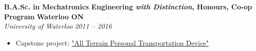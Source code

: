     \textbf{B.A.Sc. in Mechatronics Engineering \emph{with Distinction}, Honours, Co-op Program }
    \hfill
    \textbf{Waterloo ON}\\
    \textit{University of Waterloo}
    \hfill
    \textit{2011 -- 2016}
    \begin{itemize}
        \item Capstone project: \href{https://youtu.be/OwfrKlr_Zhk}{"All Terrain Personal Transportation Device"}
    \end{itemize}
